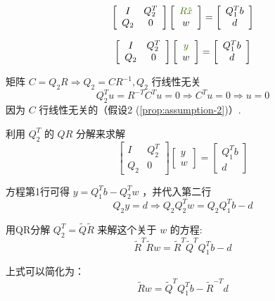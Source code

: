 $$\displaystyle \left[\begin{array}{ c c }
    I & Q_{2}^{T}\\
    Q_{2} & 0
    \end{array}\right]\left[\begin{array}{ c }
    \textcolor[rgb]{0.25,0.46,0.02}{R\hat{x}}\\
    w
    \end{array}\right] =\left[\begin{array}{ c }
    Q_{1}^{T} b\\
    d
    \end{array}\right]$$

$$\displaystyle \left[\begin{array}{ c c }
    I & Q_{2}^{T}\\
    Q_{2} & 0
    \end{array}\right]\left[\begin{array}{ c }
    \textcolor[rgb]{0.25,0.46,0.02}{y}\\
    w
    \end{array}\right] =\left[\begin{array}{ c }
    Q_{1}^{T} b\\
    d
    \end{array}\right]$$


矩阵 $ C=Q_{2} R \Rightarrow Q_{2}=C R^{-1}, Q_{2} $ 行线性无关
$$
Q_{2}^{T} u=R^{-T} C^{T} u=0  \Rightarrow  C^{T} u=0 \Rightarrow  u=0
$$
因为 $ C $ 行线性无关的（假设2 (\ref{prop:assumption-2})）.

利用 $ Q_{2}^{T} $ 的 $ Q R $ 分解来求解
$$
\left[\begin{array}{cc}
I & Q_{2}^{T} \\
Q_{2} & 0
\end{array}\right]\left[\begin{array}{l}
y \\
w
\end{array}\right]=\left[\begin{array}{c}
Q_{1}^{T} b \\
d
\end{array}\right]
$$

方程第1行可得 $ y=Q_{1}^{T} b-Q_{2}^{T} w $ ，并代入第二行
$$
Q_{2} y=d \Rightarrow Q_{2} Q_{2}^{T} w=Q_{2} Q_{1}^{T} b-d
$$

用QR分解 $ Q_{2}^{T}=\tilde{Q} \tilde{R} $ 来解这个关于 $ w $ 的方程:
$$
\tilde{R}^{T} \tilde{R} w=\tilde{R}^{T} \tilde{Q}^{T} Q_{1}^{T} b-d
$$

上式可以简化为：
$$
\tilde{R} w=\tilde{Q}^{T} Q_{1}^{T} b-\tilde{R}^{-T} d
$$


